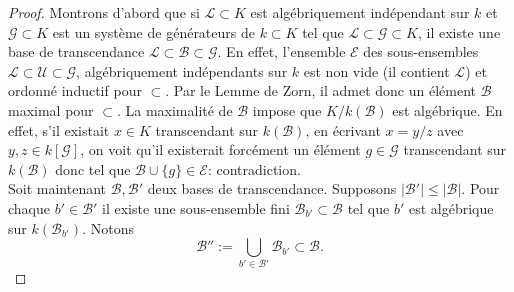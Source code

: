  \begin{proof}Montrons d'abord que si $\mathcal{L}\subset K$ est algébriquement indépendant sur $k$ et $\mathcal{G}\subset K$ est un système de générateurs de $k\subset K$ tel que $\mathcal{L}\subset \mathcal{G}\subset K$, il existe une base de transcendance $\mathcal{L}\subset \mathcal{B}\subset \mathcal{G}$. En effet, l'ensemble $\mathcal{E}$ des sous-ensembles $\mathcal{L}\subset \mathcal{U}\subset \mathcal{G}$, algébriquement indépendants sur $k$ est non vide (il contient $\mathcal{L}$) et ordonné inductif pour $\subset $. Par le Lemme de Zorn, il admet donc un élément $\mathcal{B}$ maximal pour $\subset $. La maximalité de $\mathcal{B}$ impose que $K/k(\mathcal{B})$ est algébrique. En effet, s'il existait $x\in K$ transcendant sur $k(\mathcal{B})$, en écrivant $x=y/z$ avec $y,z\in k[\mathcal{G}]$, on voit qu'il existerait forcément un élément $g\in \mathcal{G}$ transcendant sur  $k(\mathcal{B})$ donc tel que $\mathcal{B}\cup\lbrace g\rbrace \in \mathcal{E}$: contradiction.\\
  Soit maintenant $\mathcal{B},\mathcal{B}'$ deux bases de transcendance. Supposons $|\mathcal{B}'|\leq |\mathcal{B}|$. Pour chaque $b'\in \mathcal{B}'$ il existe une sous-ensemble fini $\mathcal{B}_{b'}\subset \mathcal{B}$ tel que $b'$ est algébrique sur $k(\mathcal{B}_{b'})$. Notons $$\mathcal{B}'':=\bigcup_{b'\in \mathcal{B}'}\mathcal{B}_{b'}\subset \mathcal{B}.$$

\end{proof}
